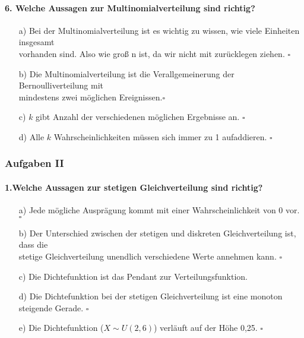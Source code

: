 \documentclass[a4paper]{article}
\begin{document}
\paragraph{6. Welche Aussagen zur Multinomialverteilung sind richtig?}
\begin{itemize}
    \item[a)] Bei der Multinomialverteilung ist es wichtig zu wissen, wie viele Einheiten insgesamt\\ vorhanden sind. Also wie groß n ist, da wir nicht mit zurücklegen ziehen. \hfill $\square$
    \item[b)] Die Multinomialverteilung ist die Verallgemeinerung der Bernoulliverteilung mit\\ mindestens zwei möglichen Ereignissen.\hfill $\square$
    \item[c)] $k$ gibt Anzahl der verschiedenen möglichen Ergebnisse an. \hfill $\square$
    \item[d)] Alle $k$ Wahrscheinlichkeiten müssen sich immer zu 1 aufaddieren. \hfill $\square$
\end{itemize}

\clearpage

\subsubsection{Aufgaben II}
\paragraph{1.Welche Aussagen zur stetigen Gleichverteilung sind richtig?}
\begin{itemize}
    \item[a)] Jede mögliche Ausprägung kommt mit einer Wahrscheinlichkeit von 0 vor. \hfill $\square$
    \item[b)] Der Unterschied zwischen der stetigen und diskreten Gleichverteilung ist, dass die\\ stetige Gleichverteilung unendlich verschiedene Werte annehmen kann. \hfill $\square$
    \item[c)] Die Dichtefunktion ist das Pendant zur Verteilungsfunktion.
    \item[d)] Die Dichtefunktion bei der stetigen Gleichverteilung ist eine monoton steigende Gerade. \hfill $\square$
    \item[e)] Die Dichtefunktion ($X \sim U(2,6)$) verläuft auf der Höhe 0,25. \hfill $\square$
\end{itemize}
\end{document}
